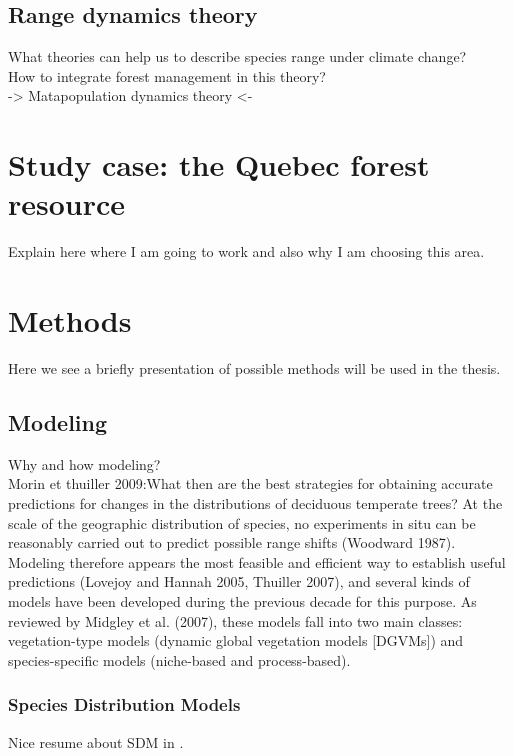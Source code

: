 \subsection{Range dynamics theory}

What theories can help us to describe species range under climate change?\\
How to integrate forest management in this theory?\\
-> Matapopulation dynamics theory <-

\section{Study case: the Quebec forest resource}

Explain here where I am going to work and also why I am choosing this area.

\section{Methods}

Here we see a briefly presentation of possible methods will be used in the thesis.

\subsection{Modeling}

Why and how modeling?\\
Morin et thuiller 2009:{What then are the best strategies for obtaining accurate predictions for changes in the distributions of deciduous temperate trees? At the scale of the geographic distribution of species, no experiments in situ can be reasonably carried out to predict possible range shifts (Woodward 1987). Modeling therefore appears the most feasible and efficient way to establish useful predictions (Lovejoy and Hannah 2005, Thuiller 2007), and several kinds of models have been developed during the previous decade for this purpose. As reviewed by Midgley et al. (2007), these models fall into two main classes: vegetation-type models (dynamic global vegetation models [DGVMs]) and species-specific models (niche-based and process-based).}

\subsubsection{Species Distribution Models}\label{sdm}

Nice resume about SDM in \citet{Moran-Ordonez2016}.

